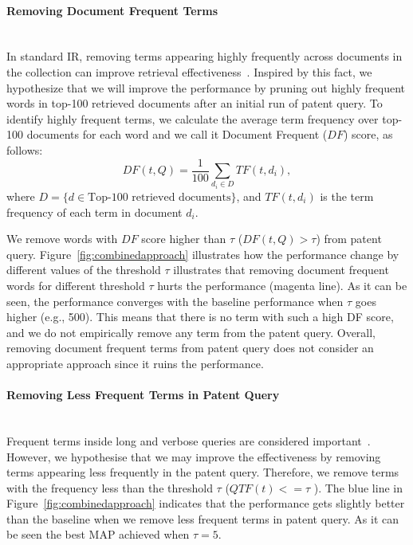 \paragraph{Removing Document Frequent Terms}
\ \\
In standard IR, removing terms appearing highly frequently across documents in the collection can improve retrieval effectiveness~\citep{manning2008introduction}. Inspired by this fact, we hypothesize that we will improve the performance by pruning out highly frequent words in top-100 retrieved documents after an initial run of patent query. To identify highly frequent terms, we calculate the average term frequency over top-100 documents for each word and we call it Document Frequent ($\mathit{DF}$) score, as follows:
\begin{equation}
 DF(t, Q)=\frac{1}{100}\sum_{d_i\in  D} TF(t, d_i),    
 \label{eq:df}
\end{equation}
where $D=\{d\in \mbox{Top-100 retrieved documents}\}$, and $TF(t, d_i)$ is the term frequency of each term in document $d_i$.

We remove words with $\mathit{DF}$ score higher than $\tau$ ($DF(t, Q)>\tau$) from patent query. Figure~\ref{fig:combinedapproach} illustrates how the performance change by different values of the threshold $\tau$ illustrates that removing document frequent words for different threshold $\tau$ hurts the performance (magenta line). As it can be seen, the performance converges with the baseline performance when $\tau$ goes higher (e.g., 500). This means that there is no term with such a high DF score, and we do not empirically remove any term from the patent query. Overall, removing document frequent terms from patent query does not consider an appropriate approach since it ruins the performance. 
\paragraph{Removing Less Frequent Terms in Patent Query}
\ \\
Frequent terms inside long and verbose queries are considered important~\citep{maxwell2013compact}. However, we hypothesise that we may improve the effectiveness by removing terms appearing less frequently in the patent query. Therefore, we remove terms with the frequency less than the threshold $\tau$ ($QTF(t)<=\tau$ ). The blue line in Figure~\ref{fig:combinedapproach} indicates that the performance gets slightly better than the baseline when we remove less frequent terms in patent query. As it can be seen the best MAP achieved when $\tau=5$. 
